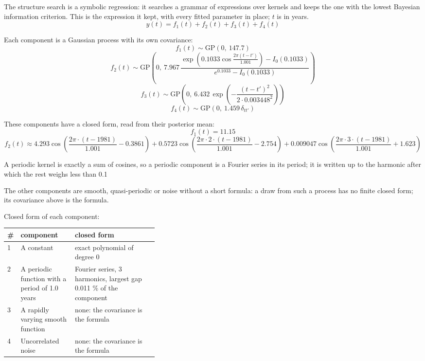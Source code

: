 \documentclass[11pt,a4paper]{article}
\begin{document}
The structure search is a symbolic regression: it searches a grammar of expressions over kernels and keeps the one with the lowest Bayesian information criterion. This is the expression it kept, with every fitted parameter in place; $t$ is in years.
\begin{dmath*}
y(t) = f_{1}(t) + f_{2}(t) + f_{3}(t) + f_{4}(t)
\end{dmath*}

Each component is a Gaussian process with its own covariance:
\begin{dmath*}
f_{1}(t) \sim \mathrm{GP}\!\left(0,\ 147.7\right)
\end{dmath*}
\begin{dmath*}
f_{2}(t) \sim \mathrm{GP}\!\left(0,\ 7.967\,\frac{\exp\!\left(0.1033\cos\frac{2\pi (t - t')}{1.001}\right) - I_0(0.1033)}{e^{0.1033} - I_0(0.1033)}\right)
\end{dmath*}
\begin{dmath*}
f_{3}(t) \sim \mathrm{GP}\!\left(0,\ 6.432\,\exp\!\left(-\frac{(t - t')^2}{2 \cdot 0.003448^2}\right)\right)
\end{dmath*}
\begin{dmath*}
f_{4}(t) \sim \mathrm{GP}\!\left(0,\ 1.459\,\delta_{t t'}\right)
\end{dmath*}

These components have a closed form, read from their posterior mean:
\begin{dmath*}
f_{1}(t) = 11.15
\end{dmath*}
\begin{dmath*}
f_{2}(t) \approx 4.293\cos\!\left(\frac{2\pi \cdot (t - 1981)}{1.001} - 0.3861\right) + 0.5723\cos\!\left(\frac{2\pi \cdot 2 \cdot (t - 1981)}{1.001} - 2.754\right) + 0.009047\cos\!\left(\frac{2\pi \cdot 3 \cdot (t - 1981)}{1.001} + 1.623\right)
\end{dmath*}

A periodic kernel is exactly a sum of cosines, so a periodic component is a Fourier series in its period; it is written up to the harmonic after which the rest weighs less than 0.1 %

The other components are smooth, quasi-periodic or noise without a short formula: a draw from such a process has no finite closed form; its covariance above is the formula.

Closed form of each component:

\begin{center}\footnotesize
\begin{tabular}{lp{0.36\linewidth}l}
\toprule
\# & component & closed form \\
\midrule
1 & A constant & exact polynomial of degree 0 \\
2 & A periodic function with a period of 1.0 years & Fourier series, 3 harmonics, largest gap 0.011 \% of the component \\
3 & A rapidly varying smooth function & none: the covariance is the formula \\
4 & Uncorrelated noise & none: the covariance is the formula \\
\bottomrule
\end{tabular}
\end{center}
\end{document}

